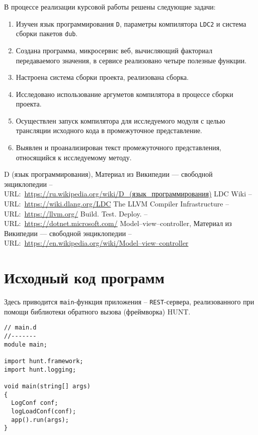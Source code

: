 \documentclass{studrep}
\begin{document}
В процессе реализации курсовой работы решены следующие задачи:
\begin{enumerate}
\item Изучен язык программирования \verb|D|, параметры компилятора \verb|LDC2| и система сборки пакетов \verb|dub|.
\item Создана программа, микросервис веб, вычисляющий факториал передаваемого значения, в сервисе реализовано четыре полезные функции.
\item Настроена система сборки проекта, реализована сборка.
\item Исследовано использование аргуметов компилятора в процессе сборки проекта.
\item Осуществлен запуск компилятора для исследуемого модуля с целью трансляции исходного кода в промежуточное представление.
\item Выявлен и проанализирован текст промежуточного представления, относящийся к исследуемому методу.
\end{enumerate}

\begin{thebibliography}{9}
 D (язык программирования), Материал из Википедии — свободной энциклопедии -- URL:~\url{https://ru.wikipedia.org/wiki/D_(язык_программирования)}
 LDC Wiki -- URL:~\url{https://wiki.dlang.org/LDC}
 The LLVM Compiler Infrastructure -- URL:~\url{https://llvm.org/}
 Build. Test. Deploy. -- URL:~\url{https://dotnet.microsoft.com/}
 Model–view–controller, Материал из Википедии — свободной энциклопедии -- URL:~\url{https://en.wikipedia.org/wiki/Model–view–controller}
\end{thebibliography}

\appendices

\appendix
\chapter{Исходный код программ}

Здесь приводится \texttt{main}-функция приложения -- \texttt{REST}-сервера, реализованного при помощи библиотеки обратного вызова (фреймворка) HUNT.
\begin{verbatim}
// main.d
//-------
module main;

import hunt.framework;
import hunt.logging;

void main(string[] args)
{
  LogConf conf;
  logLoadConf(conf);
  app().run(args);
}
\end{verbatim}
\end{document}

